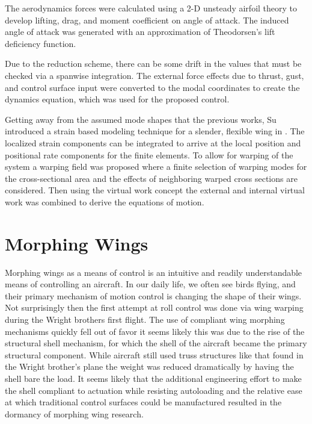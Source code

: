\documentclass[11pt]{ucthesis}
\begin{document}
The aerodynamics forces were calculated using a 2-D unsteady airfoil theory to develop lifting, drag, and moment coefficient on angle of attack. The induced angle of attack was generated with an approximation of Theodorsen's lift deficiency function.

Due to the reduction scheme, there can be some drift in the values that must be checked via a spanwise integration. The external force effects due to thrust, gust, and control surface input were converted to the modal coordinates to create the dynamics equation, which was used for the proposed control.

Getting away from the assumed mode shapes that the previous works, Su introduced a strain based modeling technique for a slender, flexible wing in \cite{su2014modified}. The localized strain components can be integrated to arrive at the local position and positional rate components for the finite elements. To allow for warping of the system a warping field was proposed where a finite selection of warping modes for the cross-sectional area and the effects of neighboring warped cross sections are considered. Then using the virtual work concept the external and internal virtual work was combined to derive the equations of motion.

\section{Morphing Wings}
Morphing wings as a means of control is an intuitive and readily understandable means of controlling an aircraft. In our daily life, we often see birds flying, and their primary mechanism of motion control is changing the shape of their wings. Not surprisingly then the first attempt at roll control was done via wing warping during the Wright brothers first flight. \cite{friswell2009prospects} The use of compliant wing morphing mechanisms quickly fell out of favor it seems likely this was due to the rise of the structural shell mechanism, for which the shell of the aircraft became the primary structural component. While aircraft still used truss structures like that found in the Wright brother's plane the weight was reduced dramatically by having the shell bare the load. \cite{weisshaar2011aerospace} It seems likely that the additional engineering effort to make the shell compliant to actuation while resisting autoloading and the relative ease at which traditional control surfaces could be manufactured resulted in the dormancy of morphing wing research.
\end{document}
